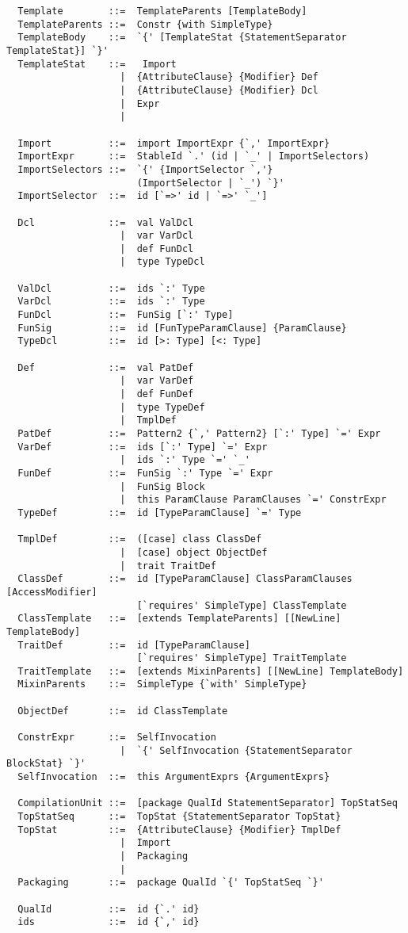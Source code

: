 \begin{lstlisting}
  Template        ::=  TemplateParents [TemplateBody]
  TemplateParents ::=  Constr {with SimpleType}
  TemplateBody    ::=  `{' [TemplateStat {StatementSeparator TemplateStat}] `}'
  TemplateStat    ::=   Import
                    |  {AttributeClause} {Modifier} Def
                    |  {AttributeClause} {Modifier} Dcl
                    |  Expr
                    |

  Import          ::=  import ImportExpr {`,' ImportExpr}
  ImportExpr      ::=  StableId `.' (id | `_' | ImportSelectors)
  ImportSelectors ::=  `{' {ImportSelector `,'} 
                       (ImportSelector | `_') `}'
  ImportSelector  ::=  id [`=>' id | `=>' `_']

  Dcl             ::=  val ValDcl
                    |  var VarDcl
                    |  def FunDcl
                    |  type TypeDcl

  ValDcl          ::=  ids `:' Type
  VarDcl          ::=  ids `:' Type
  FunDcl          ::=  FunSig [`:' Type]
  FunSig          ::=  id [FunTypeParamClause] {ParamClause}
  TypeDcl         ::=  id [>: Type] [<: Type]

  Def             ::=  val PatDef
                    |  var VarDef
                    |  def FunDef
                    |  type TypeDef
                    |  TmplDef
  PatDef          ::=  Pattern2 {`,' Pattern2} [`:' Type] `=' Expr
  VarDef          ::=  ids [`:' Type] `=' Expr
                    |  ids `:' Type `=' `_'
  FunDef          ::=  FunSig `:' Type `=' Expr
                    |  FunSig Block
                    |  this ParamClause ParamClauses `=' ConstrExpr
  TypeDef         ::=  id [TypeParamClause] `=' Type

  TmplDef         ::=  ([case] class ClassDef
                    |  [case] object ObjectDef
                    |  trait TraitDef
  ClassDef        ::=  id [TypeParamClause] ClassParamClauses [AccessModifier]
                       [`requires' SimpleType] ClassTemplate 
  ClassTemplate   ::=  [extends TemplateParents] [[NewLine] TemplateBody]
  TraitDef        ::=  id [TypeParamClause]
                       [`requires' SimpleType] TraitTemplate
  TraitTemplate   ::=  [extends MixinParents] [[NewLine] TemplateBody]
  MixinParents    ::=  SimpleType {`with' SimpleType}
  
  ObjectDef       ::=  id ClassTemplate

  ConstrExpr      ::=  SelfInvocation
                    |  `{' SelfInvocation {StatementSeparator BlockStat} `}'
  SelfInvocation  ::=  this ArgumentExprs {ArgumentExprs}

  CompilationUnit ::=  [package QualId StatementSeparator] TopStatSeq
  TopStatSeq      ::=  TopStat {StatementSeparator TopStat}
  TopStat         ::=  {AttributeClause} {Modifier} TmplDef
                    |  Import
                    |  Packaging
                    |
  Packaging       ::=  package QualId `{' TopStatSeq `}'

  QualId          ::=  id {`.' id}
  ids             ::=  id {`,' id}
\end{lstlisting}

